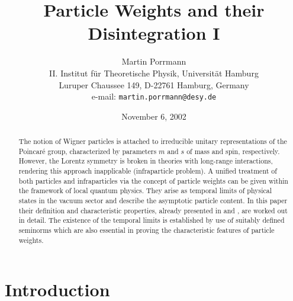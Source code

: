 \documentclass[a4paper,a4paper]{article}
\numberwithin{equation}{section}
\theoremstyle{definition}
\theoremstyle{plain}
\theoremstyle{remark}
\begin{document}
%
\title{Particle Weights and their Disintegration I}
\author{Martin Porrmann\\
  II. Institut f\"ur Theoretische Physik, Universit\"at Hamburg\\
  Luruper Chaussee 149, D-22761 Hamburg, Germany\\
  e-mail: \texttt{martin.porrmann@desy.de}}
\date{November 6, 2002}

\maketitle

%
\begin{abstract}
  The notion of Wigner particles is attached to irreducible unitary
  representations of the Poincar\'e group, characterized by parameters
  $m$ and $s$ of mass and spin, respectively. However, the Lorentz
  symmetry is broken in theories with long-range interactions,
  rendering this approach inapplicable (infraparticle problem). A
  unified treatment of both particles and infraparticles via the
  concept of particle weights can be given within the framework of
  local quantum physics. They arise as temporal limits of physical
  states in the vacuum sector and describe the asymptotic particle
  content. In this paper their definition and characteristic
  properties, already presented in \cite{buchholz/porrmann/stein:1991}
  and \cite{haag:1996}, are worked out in detail. The existence of the
  temporal limits is established by use of suitably defined seminorms
  which are also essential in proving the characteristic features of
  particle weights.
\end{abstract}
%


\section{Introduction}
  \label{sec:introduction}
  
\end{document}
